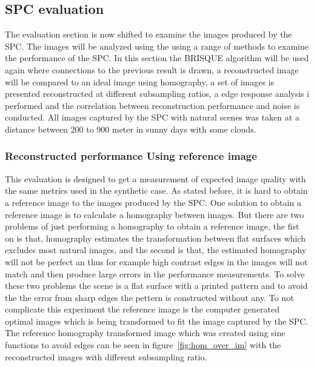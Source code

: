 

\subsection{SPC evaluation}
\label{sec:eval_spc}
The evaluation section is now shifted to examine the images produced by the SPC. The images will be analyzed using the using a range of methods to examine the performance of the SPC. In this section the BRISQUE algorithm will be used again where connections to the previous result is drawn, a reconstructed image will be compared to an ideal image using homography, a set of images is presented reconstructed at different subsampling ratios, a edge response analysis i performed and the correlation between reconstruction performance and noise is conducted. All images captured by the SPC with natural scenes was taken at a distance between 200 to 900 meter in sunny days with some clouds.


\subsubsection{Reconstructed performance Using reference image}
This evaluation is designed to get a measurement of expected image quality with the same metrics used in the synthetic case. As stated before, it is hard to obtain a reference image to the images produced by the SPC. One solution to obtain a reference image is to calculate a homography between images. But there are two problems of just performing a homography to obtain a reference image, the fist on is that, homography estimates the transformation between flat surfaces which excludes most natural images, and the second is that, the estimated homography will not be perfect an thus for example high contrast edges in the images will not match and then produce large errors in the performance measurements. To solve these two problems the scene is a flat surface with a printed pattern and to avoid the the error from sharp edges the pettern is constructed without any. To not complicate this experiment the reference image is the computer generated optimal images which is being transformed to fit the image captured by the SPC.\\[0.1in] 

The reference homography transformed image which was created using sine functions to avoid edges can be seen in figure~\ref{fig:hom_over_im} with the reconstructed images with different subsampling ratio.   


